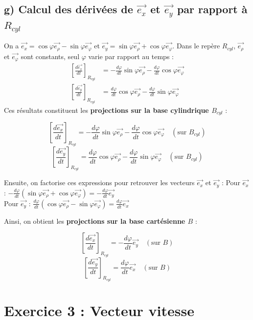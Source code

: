 \documentclass[11pt,a4paper]{article}
\begin{document}
\subsection*{g) Calcul des dérivées de $\vec{e_x}$ et $\vec{e_y}$ par rapport à $R_{cyl}$}
On a $\vec{e_x} = \cos\varphi \vec{e_\rho} - \sin\varphi \vec{e_\varphi}$ et $\vec{e_y} = \sin\varphi \vec{e_\rho} + \cos\varphi \vec{e_\varphi}$.
Dans le repère $R_{cyl}$, $\vec{e_\rho}$ et $\vec{e_\varphi}$ sont constants, seul $\varphi$ varie par rapport au temps :
\begin{align*}
\left[\frac{d\vec{e_x}}{dt}\right]_{R_{cyl}} &= -\frac{d\varphi}{dt}\sin\varphi \vec{e_\rho} - \frac{d\varphi}{dt}\cos\varphi \vec{e_\varphi} \\
\left[\frac{d\vec{e_y}}{dt}\right]_{R_{cyl}} &= \frac{d\varphi}{dt}\cos\varphi \vec{e_\rho} - \frac{d\varphi}{dt}\sin\varphi \vec{e_\varphi}
\end{align*}
Ces résultats constituent les \textbf{projections sur la base cylindrique $B_{cyl}$} :
\begin{sonucbox}
$$ \left[\frac{d\vec{e_x}}{dt}\right]_{R_{cyl}} = -\frac{d\varphi}{dt}\sin\varphi \vec{e_\rho} - \frac{d\varphi}{dt}\cos\varphi \vec{e_\varphi} \quad (\text{sur } B_{cyl}) $$
$$ \left[\frac{d\vec{e_y}}{dt}\right]_{R_{cyl}} = \frac{d\varphi}{dt}\cos\varphi \vec{e_\rho} - \frac{d\varphi}{dt}\sin\varphi \vec{e_\varphi} \quad (\text{sur } B_{cyl}) $$
\end{sonucbox}

Ensuite, on factorise ces expressions pour retrouver les vecteurs $\vec{e_x}$ et $\vec{e_y}$ :
Pour $\vec{e_x}$ : $-\frac{d\varphi}{dt} (\sin\varphi \vec{e_\rho} + \cos\varphi \vec{e_\varphi}) = -\frac{d\varphi}{dt} \vec{e_y}$ \\
Pour $\vec{e_y}$ : $\frac{d\varphi}{dt} (\cos\varphi \vec{e_\rho} - \sin\varphi \vec{e_\varphi}) = \frac{d\varphi}{dt} \vec{e_x}$

Ainsi, on obtient les \textbf{projections sur la base cartésienne $B$} :
\begin{sonucbox}
$$ \left[\frac{d\vec{e_x}}{dt}\right]_{R_{cyl}} = -\frac{d\varphi}{dt} \vec{e_y} \quad (\text{sur } B) $$
$$ \left[\frac{d\vec{e_y}}{dt}\right]_{R_{cyl}} = \frac{d\varphi}{dt} \vec{e_x} \quad (\text{sur } B) $$
\end{sonucbox}

\newpage

\section*{Exercice 3 : Vecteur vitesse}
\end{document}
